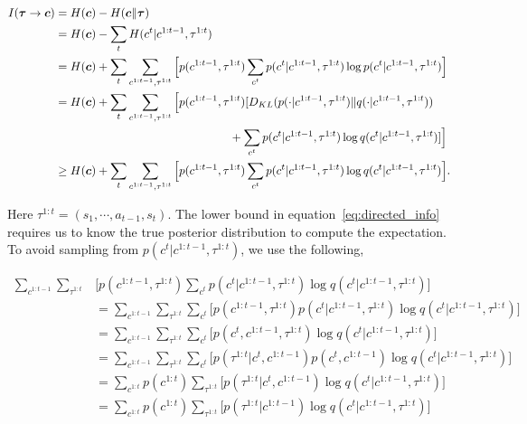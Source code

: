 \documentclass{article} %
\begin{document}
\begin{align}
\footnotesize
I(\boldsymbol{\tau} \rightarrow \boldsymbol{c}) &= H(\boldsymbol{c}) - H(\boldsymbol{c} \| \boldsymbol{\tau})& &\nonumber \\
&= H(\boldsymbol{c}) - \sum_{t}H(c^{t}|c^{1:t-1}, \tau^{1:t})& & \nonumber \\
&= H(\boldsymbol{c}) + \sum_{t} \sum_{c^{1:t-1}, \tau^{1:t}} \Big[ p(c^{1:t-1}, \tau^{1:t}) \sum_{c^{t}} p(c^{t} | c^{1:t-1}, \tau^{1:t}) \log p(c^{t} | c^{1:t-1}, \tau^{1:t})\Big]  \nonumber \\
&= H(\boldsymbol{c}) + \sum_{t} \sum_{c^{1:t-1}, \tau^{1:t}} \Big[ p(c^{1:t-1}, \tau^{1:t})  [D_{KL}(p(\cdot | c^{1:t-1}, \tau^{1:t}) \| q(\cdot | c^{1:t-1}, \tau^{1:t})) \nonumber \\
& \hspace{5.275cm} + \sum_{c^{t}} p(c^{t} | c^{1:t-1}, \tau^{1:t}) \log q(c^{t} | c^{1:t-1}, \tau^{1:t})]\Big]   \nonumber \\
&\geq H(\boldsymbol{c}) + \sum_{t} \sum_{c^{1:t-1}, \tau^{1:t}} \Big[ p(c^{1:t-1}, \tau^{1:t}) \sum_{c^{t}} p(c^{t} | c^{1:t-1}, \tau^{1:t}) \log q(c^{t} | c^{1:t-1}, \tau^{1:t})\Big]. \label{eq:directed_info}
\end{align}

Here $\tau^{1:t} = (s_1, \cdots, a_{t-1}, s_{t})$. The lower bound in equation~\ref{eq:directed_info} requires us to know the true posterior distribution to compute the expectation. To avoid sampling from $p(c^{t}|c^{1:t-1}, \tau^{1:t})$, we use the following,

\begin{align}
\sum_{c^{1:t-1}} \sum_{\tau^{1:t}} & \Big[ p(c^{1:t-1}, \tau^{1:t}) \sum_{c^{t}} p(c^{t} | c^{1:t-1}, \tau^{1:t}) \log q(c^{t} | c^{1:t-1}, \tau^{1:t})\Big] \nonumber \\
&= \sum_{c^{1:t-1}} \sum_{\tau^{1:t}} \sum_{c^{t}} \Big[ p(c^{1:t-1}, \tau^{1:t}) p(c^{t} | c^{1:t-1}, \tau^{1:t}) \log q(c^{t} | c^{1:t-1}, \tau^{1:t})\Big] \nonumber \\
&= \sum_{c^{1:t-1}} \sum_{\tau^{1:t}} \sum_{c^{t}} \Big[ p(c^{t}, c^{1:t-1}, \tau^{1:t}) \log q(c^{t} | c^{1:t-1}, \tau^{1:t})] \nonumber \\
&= \sum_{c^{1:t-1}} \sum_{\tau^{1:t}} \sum_{c^{t}}  \Big[p(\tau^{1:t} | c^{t}, c^{1:t-1}) p(c^{t}, c^{1:t-1}) \log q(c^{t} | c^{1:t-1}, \tau^{1:t}) \Big] \nonumber \\
&= \sum_{c^{1:t}} p(c^{1:t})\sum_{\tau^{1:t}}  \Big[p(\tau^{1:t} | c^{t}, c^{1:t-1}) \log q(c^{t} | c^{1:t-1}, \tau^{1:t}) \Big] \nonumber \\
&= \sum_{c^{1:t}} p(c^{1:t})\sum_{\tau^{1:t}}  \Big[p(\tau^{1:t} | c^{1:t-1}) \log q(c^{t} | c^{1:t-1}, \tau^{1:t}) \Big]
\label{eq:directed_info2}
\end{align}
\end{document}
